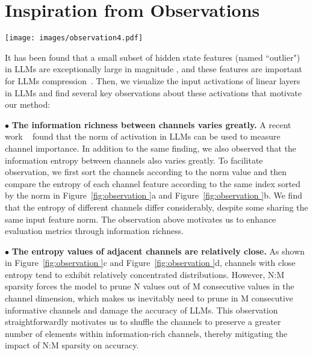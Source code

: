 \section{Inspiration from Observations}
\label{sec:IC}

\begin{figure*}[t]
	\begin{center}
		\texttt{[image: images/observation4.pdf]}
	\end{center}
	\caption{The visualization of the hidden activations in LLMs. The data for each subfigure comes from the activation of the corresponding layer of LLaMA-13B. For clarity, we only capture the norm and entropy values for the 100 channels after norm sorting in (a) and (b). We show the entropy values of all channels in (c) and (d).}
	\label{fig:observation }
\end{figure*}

It has been found that a small subset of hidden state features (named ``outlier") in LLMs are exceptionally large in magnitude \cite{dettmers2022llm, xiao2023smoothquant}, and these features are important for LLMs compression~\cite{sun2023simple}. Then, we visualize the input activations of linear layers in LLMs and find several key observations about these activations that motivate our method:

\noindent $\bullet$ \textbf{The information richness between channels varies greatly.} A recent work ~\cite{sun2023simple} found that the norm of activation in LLMs can be used to measure channel importance. In addition to the same finding, we also observed that the information entropy between channels also varies greatly. 
To facilitate observation, we first sort the channels according to the norm value and then compare the entropy of each channel feature according to the same index sorted by the norm in Figure~\ref{fig:observation }a and Figure~\ref{fig:observation }b. We find that the entropy of different channels differ considerably, despite some sharing the same input feature norm. The observation above motivates us to enhance evaluation metrics through information richness.

\noindent $\bullet$ \textbf{The entropy values of adjacent channels are relatively close.} As shown in Figure~\ref{fig:observation }c and Figure~\ref{fig:observation }d, channels
with close entropy tend to exhibit relatively concentrated distributions. 
However, N:M sparsity forces the model to prune N values out of M consecutive values in the channel dimension, which makes us inevitably need to prune in M consecutive informative channels and damage the accuracy of LLMs. 
This observation straightforwardly motivates us to shuffle the channels to preserve a greater number of elements within information-rich channels, thereby mitigating the impact of N:M sparsity on accuracy.

